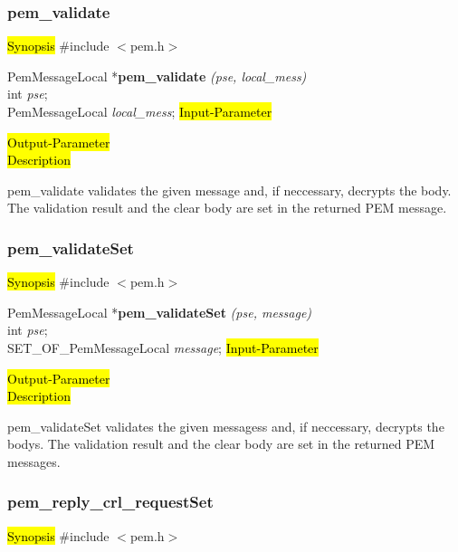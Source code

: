 \subsubsection{pem\_validate}
\label{pem_validate}
\hl{Synopsis}
\#include $<$pem.h$>$ 

PemMessageLocal *{\bf pem\_validate} {\em (pse, local\_mess)} \\
int {\em pse};\\
PemMessageLocal {\em *local\_mess};
\hl{Input-Parameter}

\hl{Output-Parameter}
 \\
\hl{Description}

pem\_validate validates the given message and,
if neccessary, decrypts the body.
The validation result  and the clear body are set
in the returned PEM message.











\subsubsection{pem\_validateSet}
\label{pem_validateSet}
\hl{Synopsis}
\#include $<$pem.h$>$ 

PemMessageLocal *{\bf pem\_validateSet} {\em (pse, message)} \\
int {\em pse};\\
SET\_OF\_PemMessageLocal {\em *message};
\hl{Input-Parameter}

\hl{Output-Parameter}
 \\
\hl{Description}

pem\_validateSet validates the given messagess and,
if neccessary, decrypts the bodys.
The validation result  and the clear body are set
in the returned PEM messages.




 

\subsubsection{pem\_reply\_crl\_requestSet}
\label{pem_reply_crl_requestSet}
\hl{Synopsis}
\#include $<$pem.h$>$ 

